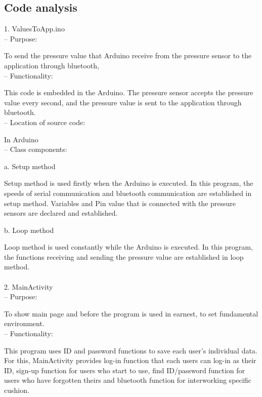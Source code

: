 \documentclass[conference]{IEEEtran}
\begin{document}
\subsection{Code analysis\\}

1. ValuesToApp.ino\\

 -- Purpose: 

To send the pressure value that Arduino receive from the pressure sensor to the application through bluetooth,\\

 --	Functionality:

This code is embedded in the Arduino. The pressure sensor accepts the pressure value every second, and the pressure value is sent to the application through bluetooth. \\

 --	Location of source code:

In Arduino\\

 --	Class components:

a. Setup method 

Setup method is used firstly when the Arduino is executed. In this program, the speeds of serial communication and bluetooth communication are established in setup method. Variables and Pin value that is connected with the pressure sensors are declared and established. 

b. Loop method 

Loop method is used constantly while the Arduino is executed. In this program, the functions receiving and sending the pressure value are established in loop method. \\\\

2. MainActivity\\

 --	Purpose:
 
To show main page and before the program is used in earnest, to set fundamental environment.\\

 --	Functionality:
 
This program uses ID and password functions to save each user's individual data. For this, MainActivity provides log-in function that each users can log-in as their ID, sign-up function for users who start to use, find ID/password function for users who have forgotten theirs and bluetooth function for interworking specific cushion. \\
\end{document}
